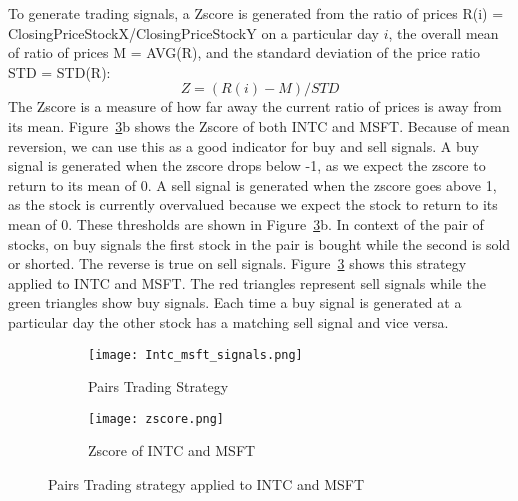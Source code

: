 \documentclass[../thesis.tex]{subfiles}
\begin{document}
To generate trading signals, a Zscore is generated from the ratio of prices R(i) = ClosingPriceStockX/ClosingPriceStockY on a particular day $i$, the overall mean of ratio of prices M = AVG(R), and the standard deviation of the price ratio STD = STD(R): \[ Z = (R(i) - M)/STD\] The Zscore is a measure of how far away the current ratio of prices is away from its mean. Figure~\ref{PAIRSfigure}b shows the Zscore of both INTC and MSFT. Because of mean reversion, we can use this as a good indicator for buy and sell signals. A buy signal is generated when the zscore drops below -1, as we expect the zscore to return to its mean of 0. A sell signal is generated when the zscore goes above 1, as the stock is currently overvalued because we expect the stock to return to its mean of 0\cite{Fu2009}. These thresholds are shown in Figure~\ref{PAIRSfigure}b. In context of the pair of stocks, on buy signals the first stock in the pair is bought while the second is sold or shorted. The reverse is true on sell signals. Figure~\ref{PAIRSfigure} shows this strategy applied to INTC and MSFT. The red triangles represent sell signals while the green triangles show buy signals. Each time a buy signal is generated at a particular day the other stock has a matching sell signal and vice versa.

\begin{figure}[h]
\centering
\begin{subfigure}[t]{0.45\textwidth}
\texttt{[image: Intc\_msft\_signals.png]}
\caption{Pairs Trading Strategy  \label{overflow}}
\end{subfigure}
\begin{subfigure}[t]{0.45\textwidth}
\texttt{[image: zscore.png]}
\caption{Zscore of INTC and  MSFT \label{overflow}}
\end{subfigure}

\caption{Pairs Trading strategy applied to INTC and MSFT  \label{overflow}}
\label{PAIRSfigure}
\end{figure}
\end{document}
